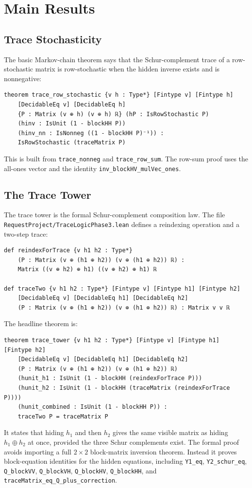 \documentclass[11pt]{article}
\begin{document}
\section{Main Results}

\subsection{Trace Stochasticity}

The basic Markov-chain theorem says that the Schur-complement trace of a row-stochastic matrix is row-stochastic when the hidden inverse exists and is nonnegative:
\begin{lstlisting}[style=lean]
theorem trace_row_stochastic {v h : Type*} [Fintype v] [Fintype h]
    [DecidableEq v] [DecidableEq h]
    {P : Matrix (v ⊕ h) (v ⊕ h) ℝ} (hP : IsRowStochastic P)
    (hinv : IsUnit (1 - blockHH P))
    (hinv_nn : IsNonneg ((1 - blockHH P)⁻¹)) :
    IsRowStochastic (traceMatrix P)
\end{lstlisting}
This is built from \texttt{trace_nonneg} and \texttt{trace_row_sum}.
The row-sum proof uses the all-ones vector and the identity
\texttt{inv_blockHV_mulVec_ones}.

\subsection{The Trace Tower}

The trace tower is the formal Schur-complement composition law.
The file \texttt{RequestProject/TraceLogicPhase3.lean} defines a reindexing operation and a two-step trace:
\begin{lstlisting}[style=lean]
def reindexForTrace {v h1 h2 : Type*}
    (P : Matrix (v ⊕ (h1 ⊕ h2)) (v ⊕ (h1 ⊕ h2)) ℝ) :
    Matrix ((v ⊕ h2) ⊕ h1) ((v ⊕ h2) ⊕ h1) ℝ

def traceTwo {v h1 h2 : Type*} [Fintype v] [Fintype h1] [Fintype h2]
    [DecidableEq v] [DecidableEq h1] [DecidableEq h2]
    (P : Matrix (v ⊕ (h1 ⊕ h2)) (v ⊕ (h1 ⊕ h2)) ℝ) : Matrix v v ℝ
\end{lstlisting}
The headline theorem is:
\begin{lstlisting}[style=lean]
theorem trace_tower {v h1 h2 : Type*} [Fintype v] [Fintype h1] [Fintype h2]
    [DecidableEq v] [DecidableEq h1] [DecidableEq h2]
    (P : Matrix (v ⊕ (h1 ⊕ h2)) (v ⊕ (h1 ⊕ h2)) ℝ)
    (hunit_h1 : IsUnit (1 - blockHH (reindexForTrace P)))
    (hunit_h2 : IsUnit (1 - blockHH (traceMatrix (reindexForTrace P))))
    (hunit_combined : IsUnit (1 - blockHH P)) :
    traceTwo P = traceMatrix P
\end{lstlisting}
It states that hiding \(h_1\) and then \(h_2\) gives the same visible matrix as hiding \(h_1 \oplus h_2\) at once, provided the three Schur complements exist.
The formal proof avoids importing a full \(2\times 2\) block-matrix inversion theorem.
Instead it proves block-equation identities for the hidden equations, including \texttt{Y1_eq}, \texttt{Y2_schur_eq}, \texttt{Q_blockVV}, \texttt{Q_blockVH}, \texttt{Q_blockHV}, \texttt{Q_blockHH}, and \texttt{traceMatrix_eq_Q_plus_correction}.
\end{document}
